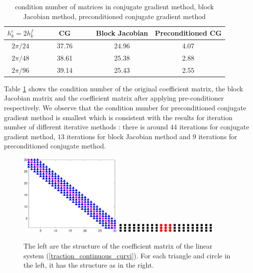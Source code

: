 \begin{table}[htbp]
	\begin{center}
		\begin{tabular}{|c|c c c|}
			\hline
			$h^c_k = 2h^f_k$   & ~~~~ CG ~~~~& Block Jacobian & Preconditioned CG  \\
			\hline
			$2\pi/24$ &37.76& 24.96& 4.07\\
			\hline
			$2\pi/48$ &38.61 & 25.38 & 2.88\\
			\hline 
			$2\pi/96$ &39.14 &25.43 & 2.55\\
			\hline
		\end{tabular}
	\end{center}
	\caption{condition number of matrices in conjugate gradient method, block Jacobian method, preconditioned conjugate gradient method}\label{condition_number}
\end{table} 
Table \ref{condition_number} shows the condition number of the original coefficient matrix, the block Jacobian matrix and the coefficient matrix after applying pre-conditioner respectively. We observe that the condition number for preconditioned conjugate gradient method is smallest which is consistent with the results for iteration number of different iterative methods : there is around $44$ iterations for conjugate gradient method, $13$ iterations for block Jacobian method and $9$ iterations for preconditioned conjugate method.

\begin{figure}[H]
	\centering
	\includegraphics[width=0.45\textwidth]{Mass_matrix.eps}
	\includegraphics[width=0.45\textwidth]{Mass_block_diagonal.eps}
	\caption{\scriptsize{The left are the structure of the coefficient matrix of the linear system (\ref{traction_continuous_curvi}). For each triangle and circle in the left, it has the structure as in the right.}}\label{Mass_matrix}
\end{figure}
